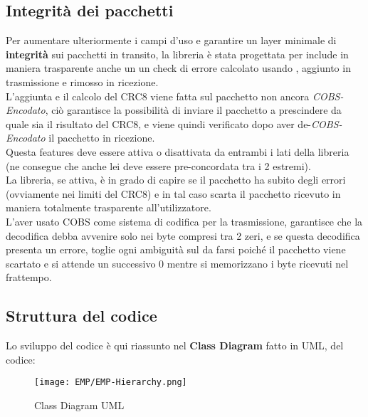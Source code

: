 \subsection{Integrità dei pacchetti}
Per aumentare ulteriormente i campi d’uso e garantire un layer minimale di \textbf{integrità} sui pacchetti in transito, la libreria è stata progettata per include in maniera trasparente anche un un check di errore calcolato usando \cite{CRC8}, aggiunto in trasmissione e rimosso in ricezione.\\
L'aggiunta e il calcolo del CRC8 viene fatta sul pacchetto non ancora \textit{COBS-Encodato}, ciò garantisce la possibilità di inviare il pacchetto a prescindere da quale sia il risultato del CRC8, e viene quindi verificato dopo aver de-\textit{COBS-Encodato} il pacchetto in ricezione.\\
Questa features deve essere attiva o disattivata da entrambi i lati della libreria (ne consegue che anche lei deve essere pre-concordata tra i 2 estremi).\\
La libreria, se attiva, è in grado di capire se il pacchetto ha subito degli errori (ovviamente nei limiti del CRC8) e in tal caso scarta il pacchetto ricevuto in maniera totalmente trasparente all'utilizzatore.\\
L’aver usato COBS come sistema di codifica per la trasmissione, garantisce che la decodifica debba avvenire solo nei byte compresi tra 2 zeri, e se questa decodifica presenta un errore, toglie ogni ambiguità sul da farsi poiché il pacchetto viene scartato e si attende un successivo 0 mentre si memorizzano i byte ricevuti nel frattempo.

\newpage
\subsection{Struttura del codice}
Lo sviluppo del codice è qui riassunto nel \textbf{Class Diagram} fatto in UML, del codice:\\
\begin{figure}[h]
	\centering
	\texttt{[image: EMP/EMP-Hierarchy.png]}
	\caption[Class Diagram UML di EMP]{Class Diagram UML}
\end{figure}


